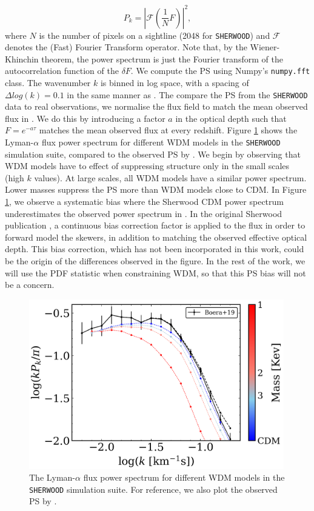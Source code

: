 \begin{equation}\label{eq: PS def}
        P_k = \left| \mathcal{F}(\frac{1}{N} F)  \right| ^2,
\end{equation}
where $N$ is the number of pixels on a sightline (2048 for \texttt{SHERWOOD}) and $\mathcal{F}$ denotes the (Fast) Fourier Transform operator. Note that, by the Wiener-Khinchin theorem, the power spectrum is just the Fourier transform of the autocorrelation function of the $\delta F$. We compute the PS using Numpy's \texttt{numpy.fft} class. The wavenumber $k$ is binned in log space, with a spacing of $\Delta log(k)=0.1$ in the same manner as \cite{Boera_2019}. The compare the PS from the \texttt{SHERWOOD} data to real observations, we normalise the flux field to match the mean observed flux in \cite{Becker_mean_flux}. We do this by introducing a factor $a$ in the optical depth such that $F=e^{-a\tau}$ matches the mean observed flux at every redshift. Figure \ref{fig: sherwood exact PS} shows the Lyman-$\alpha$ flux power spectrum for different WDM models in the \texttt{SHERWOOD} simulation suite, compared to the observed PS by \cite{Boera_2019}. We begin by observing that WDM models have to effect of suppressing structure only in the small scales (high $k$ values). At large scales, all WDM models have a similar power spectrum. Lower masses suppress the PS more than WDM models close to CDM.
In Figure \ref{fig: sherwood exact PS}, we observe a systematic bias where the Sherwood CDM power spectrum underestimates the observed power spectrum in \cite{Boera_2019}. In the original Sherwood publication \cite{Bolton_2016}, a continuous bias correction factor is applied to the flux in order to forward model the skewers, in addition to matching the observed effective optical depth. This bias correction, which has not been incorporated in this work, could be the origin of the differences observed in the figure. In the rest of the work, we will use the PDF statistic when constraining WDM, so that this PS bias will not be a concern.

\begin{figure}[ht]
        \centering
        \includegraphics[width=0.99\textwidth]{img/ML/PS_sherwood.png}
        \caption{The Lyman-$\alpha$ flux power spectrum for different WDM models in the \texttt{SHERWOOD} simulation suite. For reference, we also plot the observed PS by \cite{Boera_2019}.}
        \label{fig: sherwood exact PS}     
\end{figure}


